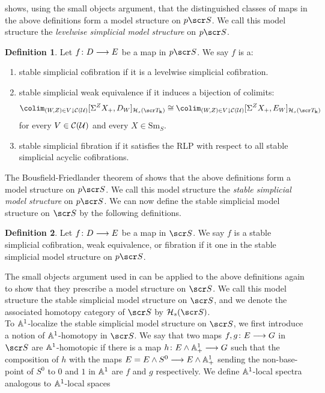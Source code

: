 \documentclass{amsart}
\theoremstyle{definition}
\newtheorem{defn}{Definition}[section]
\newcommand{\bk}{\mathbf{k}}
\begin{document}
\cite{Hu03} shows, using the small objects argument, that the distinguished classes of maps in the above definitions form a model structure on $p\sS$. We call this model structure the \emph{levelwise simplicial model structure} on $p\sS$. 

\begin{defn}
Let $f \colon D \longrightarrow E$ be a map in $p\sS$. We say $f$ is a:
\begin{enumerate}
\item stable simplicial cofibration if it is a levelwise simplicial cofibration.
\item stable simplicial weak equivalence if it induces a bijection of colimits:
\[\colim_{(W,Z) \in V \downarrow \oC(\oU)} [\SI^Z X_+, D_W]_{\oH_s(\sT_{\bk})} \iso \colim_{(W,Z) \in V \downarrow \oC(\oU)} [\SI^Z X_+, E_W]_{\oH_s(\sT_{\bk})}\]
\noindent for every $V \in {\mathcal{C}}({\mathcal{U}})$ and every $X \in \mathrm{Sm}_S$.
\item stable simplicial fibration if it satisfies the RLP with respect to all stable simplicial acyclic cofibrations.
\end{enumerate}
\end{defn}

The Bousfield-Friedlander theorem of \cite{BF78Thm} shows that the above definitions form a model structure on $p\sS$. We call this model structure the \emph{stable simplicial model structure} on $p\sS$. We can now define the stable simplicial model structure on $\sS$ by the following definitions.

\begin{defn}
Let $f \colon D \longrightarrow E$ be a map in $\sS$. We say $f$ is a stable simplicial cofibration, weak equivalence, or fibration if it one in the stable simplicial model structure on $p\sS$.
\end{defn}

\noindent The small objects argument used in \cite{Hu03} can be applied to the above definitions again to show that they prescribe a model structure on $\sS$. We call this model structure the stable simplicial model structure on $\sS$, and we denote the associated homotopy category of $\sS$ by $\oH_s(\sS)$.\\

To $\mathbb{A}^1$-localize the stable simplicial model structure on $\sS$, we first introduce a notion of $\mathbb{A}^1$-homotopy in $\sS$. We say that two maps $f, g \colon E \longrightarrow G$ in $\sS$ are $\mathbb{A}^1$-homotopic if there is a map $h \colon E \wedge \mathbb{A}^1_+ \longrightarrow G$ such that the composition of $h$ with the maps $E = E \wedge S^0 \longrightarrow E \wedge \mathbb{A}^1_+$ sending the non-base-point of $S^0$ to $0$ and $1$ in $\mathbb{A}^1$ are $f$ and $g$ respectively. We define $\mathbb{A}^1$-local spectra analogous to $\mathbb{A}^1$-local spaces
\end{document}
